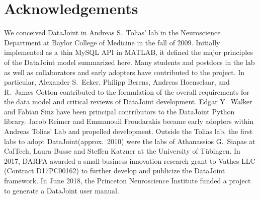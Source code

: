 \documentclass[letter,10pt]{article}
\newcommand{\datajoint}{DataJoint\xspace}
\begin{document}
\section{Acknowledgements}
We conceived \datajoint in Andreas S.\ Tolias' lab in the Neuroscience Department at Baylor College of Medicine in the fall of 2009. 
Initially implemented as a thin MySQL API in MATLAB, it defined the major principles of the \datajoint model summarized here. 
Many students and postdocs in the lab as well as collaborators and early adopters have contributed to the project.
In particular, Alexander S.\ Ecker, Philipp Berens, Andreas Hoenselaar, and R.\ James Cotton contributed to the formulation of the overall requirements for the data model and critical reviews of \datajoint development.
Edgar Y.\ Walker and Fabian Sinz have been principal contributors to the \datajoint Python library. 
Jacob Reimer and Emmanouil Froudarakis became early adopters within Andreas Tolias' Lab and propelled development.
Outside the Tolias lab, the first labs to adopt \datajoint (approx.\ 2010) were the labs of Athanassios G.\ Siapas at CalTech, Laura Busse and Steffen Katzner at the University of T\"ubingen.
In 2017, DARPA awarded a small-business innovation research grant to Vathes LLC (Contract D17PC00162) to further develop and publicize the \datajoint framework. 
In June 2018, the Princeton Neuroscience Institute funded a project to generate a DataJoint user manual.  
\end{document}
